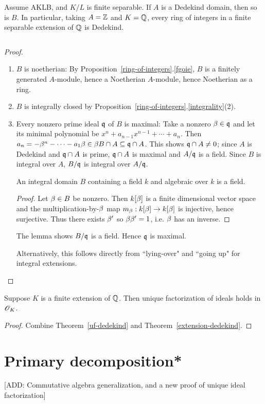 \begin{thm}
Assume AKLB, and $K/L$ is finite separable. If $A$ is a Dedekind domain, then so is $B$. In particular, taking $A=\mathbb{Z}$ and $K=\mathbb{Q}$, every ring of integers in a finite separable extension of $\mathbb{Q}$ is Dedekind.
\end{thm}$\,$
\begin{proof}$\,$
\begin{enumerate}
\item $B$ is noetherian: By Proposition~\ref{ring-of-integers}.\ref{fgoie}, $B$ is a finitely generated $A$-module, hence a Noetherian $A$-module, hence Noetherian as a ring.
\item $B$ is integrally closed by Proposition~\ref{ring-of-integers}.\ref{integrality}(2).
\item Every nonzero prime ideal $\mathfrak{q}$ of $B$ is maximal: Take a nonzero $\beta\in \mathfrak{q}$ and let its minimal polynomial be $x^n+a_{n-1}x^{n-1}+\cdots +a_n$. Then $a_n=-\beta^n-\cdots -a_1\beta\in \beta B\cap A\subseteq \mathfrak{q}\cap A$. This shows $\mathfrak{q}\cap A\ne 0$; since $A$ is Dedekind and $\mathfrak{q}\cap A$ is prime, $\mathfrak{q}\cap A$ is maximal and $A/\mathfrak{q}$ is a field. Since $B$ is integral over $A$, $B/\mathfrak{q}$ is integral over $A/\mathfrak{q}$.
\begin{lem}
An integral domain $B$ containing a field $k$ and algebraic over $k$ is a field.
\end{lem}
\begin{proof}
Let $\beta\in B$ be nonzero. Then $k[\beta]$ is a finite dimensional vector space and the multiplication-by-$\beta$ map $m_{\beta}:k[\beta]\to k[\beta]$ is injective, hence surjective. Thus there exists $\beta'$ so $\beta\beta'=1$, i.e. $\beta$ has an inverse.
\end{proof}
The lemma shows $B/\mathfrak{q}$ is a field. Hence $\mathfrak{q}$ is maximal.

Alternatively, this follows directly from ``lying-over" and ``going up" for integral extensions.\qedhere
\end{enumerate}
\end{proof}
\begin{thm}
Suppose $K$ is a finite extension of $\mathbb{Q}$. Then unique factorization of ideals holds in $\mathscr{O}_K$. 
\end{thm}
\begin{proof}
Combine Theorem~\ref{uf-dedekind} and Theorem~\ref{extension-dedekind}.
\end{proof}
\section{Primary decomposition*}
[ADD: Commutative algebra generalization, and a new proof of unique ideal factorization]
